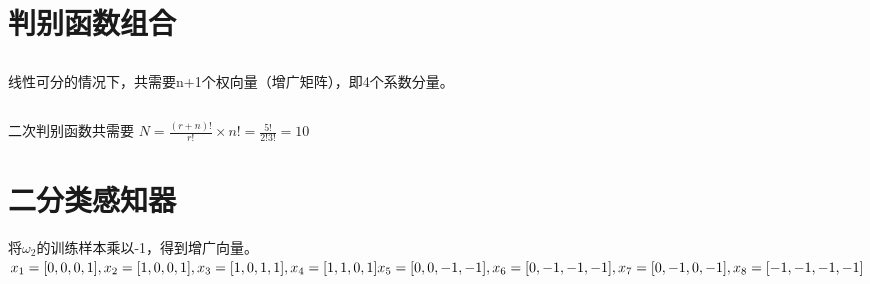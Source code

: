 \documentclass{article}
\begin{document}
\begin{CJK*}{UTF8}{gbsn}
    \section{判别函数组合}
    \subsection{} 
    线性可分的情况下，共需要n+1个权向量（增广矩阵），即4个系数分量。
    \subsection{}
    二次判别函数共需要
    \begin{math}
        N = \frac{(r+n)!}{r!} \times n ! = \frac{5!}{2!3!} = 10
    \end{math}
    
    \section{二分类感知器}
    将$\omega_{2}$的训练样本乘以-1，得到增广向量。\\
    \begin{math}
        x_{1} = [0, 0, 0, 1], x_{2} = [1, 0, 0, 1], x_{3} = [1, 0, 1, 1], x_{4} = [1, 1, 0, 1] \\
        x_{5} = [0, 0, -1, -1], x_{6} = [0, -1, -1, -1], x_{7} = [0, -1, 0, -1], x_{8} = [-1, -1, -1, -1]
    \end{math}


\end{CJK*}
\end{document}
